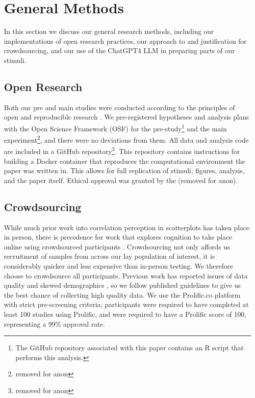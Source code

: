 \documentclass[manuscript,screen,review]{acmart}
\begin{document}
\section{General Methods}\label{sec-general-methods}

In this section we discuss our general research methods, including our
implementations of open research practices, our approach to and
justification for crowdsourcing, and our use of the ChatGPT4 LLM in
preparing parts of our stimuli.

\subsection{Open Research}\label{sec-open-research}

Both our pre and main studies were conducted according to the principles
of open and reproducible research \citep{ayris_2018}. We pre-registered
hypotheses and analysis plans with the Open Science Framework (OSF) for
the pre-study\footnote{The GitHub repository associated with this paper
  contains an R script that performs this analysis.} and the main
experiment\footnote{removed for anon}, and there were no deviations from
them. All data and analysis code are included in a GitHub
repository\footnote{removed for anon}. This repository contains
instructions for building a Docker container \citep{merkel_2014} that
reproduces the computational environment the paper was written in. This
allows for full replication of stimuli, figures, analysis, and the paper
itself. Ethical approval was granted by the (removed for anon).

\subsection{Crowdsourcing}\label{crowdsourcing}

While much prior work into correlation perception in scatterplots has
taken place in person, there is precedence for work that explores
cognition to take place online using crowdsourced participants
\citep{xiong_2022}. Crowdsourcing not only affords us recruitment of
samples from across our lay population of interest, it is considerably
quicker and less expensive than in-person testing. We therefore choose
to crowdsource all participants. Previous work has reported issues of
data quality and skewed demographics
\citep{chmielewski_2020, charalambides_2021, peer_2021}, so we follow
published guidelines \citep{peer_2021} to give us the best chance of
collecting high quality data. We use the Prolific.co platform
\citep{prolific} with strict pre-screening criteria; participants were
required to have completed at least 100 studies using Prolific, and were
required to have a Prolific score of 100, representing a 99\% approval
rate.
\end{document}
